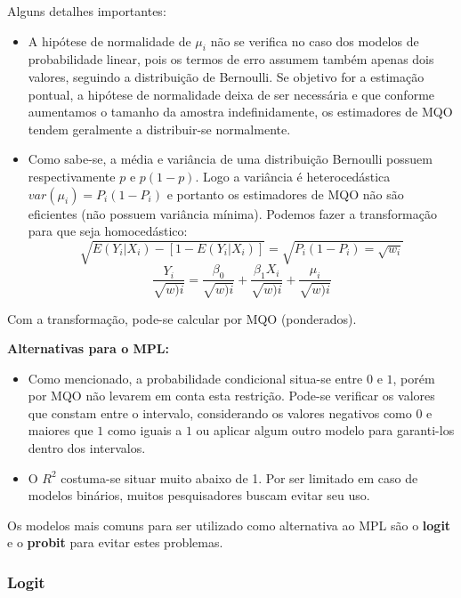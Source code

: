 \documentclass[
]{book}
\begin{document}
Alguns detalhes importantes:

\begin{itemize}
\item
  A hipótese de normalidade de \(\mu_i\) não se verifica no caso dos modelos de probabilidade linear, pois os termos de erro assumem também apenas dois valores, seguindo a distribuição de Bernoulli. Se objetivo for a estimação pontual, a hipótese de normalidade deixa de ser necessária \citep{gujarati2011econometria} e que conforme aumentamos o tamanho da amostra indefinidamente, os estimadores de MQO tendem geralmente a distribuir-se normalmente.
\item
  Como sabe-se, a média e variância de uma distribuição Bernoulli possuem respectivamente \(p\) e \(p(1-p)\). Logo a variância é heterocedástica \(var(\mu_i)=P_i(1-P_i)\) e portanto os estimadores de MQO não são eficientes (não possuem variância mínima). Podemos fazer a transformação para que seja homocedástico:
  \[\sqrt{E(Y_i|X_i)-[1-E(Y_i|X_i)]}=\sqrt{P_i(1-P_i)=\sqrt{w_i}}\]
  \begin{equation}
    \frac{Y_i}{\sqrt{w)i}} = \frac{\beta_0}{\sqrt{w)i}}+\frac{\beta_1 X_i}{\sqrt{w)i}}+\frac{\mu_i}{\sqrt{w)i}}
    \label{eq:probhomecedastico}
  \end{equation}
\end{itemize}

Com a transformação, pode-se calcular por MQO (ponderados).

\textbf{Alternativas para o MPL:}

\begin{itemize}
\item
  Como mencionado, a probabilidade condicional situa-se entre \(0\) e \(1\), porém por MQO não levarem em conta esta restrição. Pode-se verificar os valores que constam entre o intervalo, considerando os valores negativos como \(0\) e maiores que \(1\) como iguais a \(1\) ou aplicar algum outro modelo para garanti-los dentro dos intervalos.
\item
  O \(R^2\) costuma-se situar muito abaixo de 1. Por ser limitado em caso de modelos binários, muitos pesquisadores buscam evitar seu uso.
\end{itemize}

Os modelos mais comuns para ser utilizado como alternativa ao MPL são o \textbf{logit} e o \textbf{probit} para evitar estes problemas.

\hypertarget{logit}{%
\subsubsection{Logit}\label{logit}}
\end{document}
